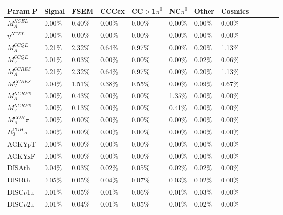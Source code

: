 \begin{table*}
\centering
{}
 \begin{tabular}{| l | l | l | l | l | l | l | l | l | l | l | l | }
 \hline
  Param P &Signal& FSEM & CCCex & CC$>$1$\pi^0$ & NC$\pi^0$& Other & Cosmics \\ [0.1ex] \hline
$M_A^{NCEL}$ & 0.00\% &  0.40\% &  0.00\% &  0.00\% &  0.00\% &  0.00\% &  0.00\%   \\
$\eta^{NCEL}$  &0.00\% &  0.00\% &  0.00\% &  0.00\% &  0.00\% &  0.00\% &  0.00\%  \\
$M_A^{CCQE}$  & 0.21\% &  2.32\% &  0.64\% &  0.97\% &  0.00\% &  0.20\% &  1.13\% \\
$M_V^{CCQE}$  & 0.01\% &  0.03\% &  0.00\% &  0.00\% &  0.00\% &  0.02\% &  0.06\% \\
$M_A^{CCRES}$  & 0.21\% &  2.32\% &  0.64\% &  0.97\% &  0.00\% &  0.20\% &  1.13\% \\
$M_V^{CCRES}$ & 0.04\% &  1.51\% &  0.38\% &  0.55\% &  0.00\% &  0.09\% &  0.67\% \\
$M_A^{NCRES}$ & 0.00\% &  0.43\% &  0.00\% &  0.00\% &  1.35\% &  0.00\% &  0.00\%  \\
$M_V^{NCRES}$ &0.00\% &  0.13\% &  0.00\% &  0.00\% &  0.41\% &  0.00\% &  0.00\%\\
$M_A^{COH}\pi$ & 0.00\% &  0.00\% &  0.00\% &  0.00\% &  0.00\% &  0.00\% &  0.00\% \\
$R_0^{COH}\pi$ & 0.00\% &  0.00\% &  0.00\% &  0.00\% &  0.00\% &  0.00\% &  0.00\% \\

AGKYpT & 0.00\% &  0.00\% &  0.00\% &  0.00\% &  0.00\% &  0.00\% &  0.00\% \\ %
AGKYxF & 0.00\% &  0.00\% &  0.00\% &  0.00\% &  0.00\% &  0.00\% &  0.00\% \\ %
DISAth & 0.04\% &  0.03\% &  0.02\% &  0.05\% &  0.02\% &  0.02\% &  0.00\% \\ %
DISBth & 0.05\% &  0.05\% &  0.04\% &  0.07\% &  0.03\% &  0.02\% &  0.00\%  \\ %
DISC$\nu$1u & 0.01\% &  0.05\% &  0.01\% &  0.06\% &  0.01\% &  0.03\% &  0.00\%\\ %
DISC$\nu$2u & 0.01\% &  0.04\% &  0.01\% &  0.05\% &  0.01\% &  0.02\% &  0.00\% \\ \hline


\end{tabular}
\end{table*}

